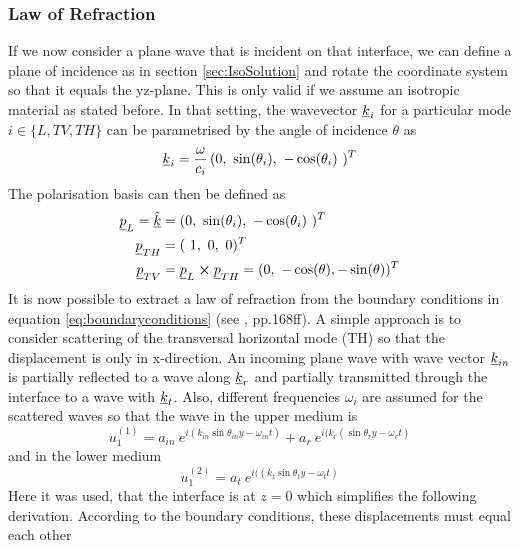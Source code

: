 \subsubsection{Law of Refraction}
If we now consider a plane wave that is incident on that interface, we can
define a plane of incidence as in section \ref{sec:IsoSolution} and rotate the
coordinate system so that it equals the yz-plane. This is only valid if we
assume an isotropic material as stated before.
In that setting, the wavevector $\underline{k}_i$ for a particular mode $i \in
    \{L,TV,TH\}$ can be parametrised by the angle of incidence $\theta$ as
\begin{equation}
    \uline{k}_i = \frac{\omega}{c_i}\, ( 0,\ \sin(\theta_i),\ -\cos(\theta_i)\
    )^T
\end{equation}
The polarisation basis can then be defined as
\begin{align}
    \uline{p}_L = \uline{\hat{k}} & = ( 0,\ \sin(\theta_i),\ -\cos(\theta_i)\
    )^T
    \\
    \uline{p}_{TH}                & = (\ 1,\ 0,\ 0)^T
    \\
    \uline{p}_{TV}                & = \uline{p}_L \cross \uline{p}_{TH}
    = ( 0,\ -\cos(\theta), -\sin(\theta))^T
\end{align}
It is now possible to extract a law of refraction from the boundary conditions
in equation \ref{eq:boundaryconditions} (see \cite{achenbach1973wave}, pp.168ff). 
A simple approach is to consider
scattering of the transversal horizontal mode (TH) so that the displacement is
only in x-direction. An incoming plane wave with
wave vector $\underline{k}_{in}$ is partially reflected to a wave along
$\underline{k}_r$ and partially transmitted through the interface to a wave with
$\underline{k}_t$. Also, different frequencies $\omega_i$ are assumed for the
scattered waves so that the wave in the upper medium is
\begin{equation}
    u_1^{(1)} = a_{in}\
    e^{i( k_{in}\sin\theta_{in} y-\omega_{in} t)}
    + a_r\ e^{i( k_{r}(\sin\theta_{r} y -\omega_{r} t)}
\end{equation}
and in the lower medium
\begin{equation}
    u_1^{(2)} = a_{t}\
    e^{i(( k_{t}\sin\theta_{t} y -\omega_{t} t)}
\end{equation}
Here it was used, that the interface is at $z=0$ which simplifies the following
derivation.
According to the boundary conditions, these displacements must equal each other
